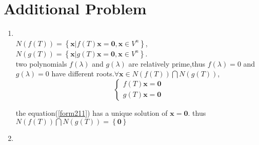 \documentclass[12pt,a4paper]{article}
\begin{document}
\section{Additional Problem}
\begin{enumerate}[(1)]
	\item {} \\
	\indent $N(f(T)) = \left\lbrace \bm{x}|f(T)\bm{x} = \bm{0},\bm{x} \in V^{n}\right \rbrace$, 
			$N(g(T)) = \left\lbrace \bm{x}|g(T)\bm{x} = \bm{0},\bm{x} \in V^{n}\right \rbrace$.\\
	two polynomials $f(\lambda)$ and $g(\lambda)$ are relatively prime,thus $f(\lambda) = 0$ and $g(\lambda) = 0$
	have different roots.$\forall \bm{x} \in N(f(T))\bigcap N(g(T))$,
	\begin{equation}
	\label{form211}
	\left\lbrace 
	\begin{split} 
	f(T)\bm{x} = \bm{0}\\
	g(T)\bm{x} = \bm{0} 
	\end{split} \right .  
	\end{equation} 


	the equation(\ref{form211}) has a unique solution of $\bm{x} = \bm{0}$.	
	thus $N(f(T)) \bigcap N(g(T)) = \left\lbrace \bm{0}\right\rbrace$	
			
   \item 
\end{enumerate}
\end{document}
